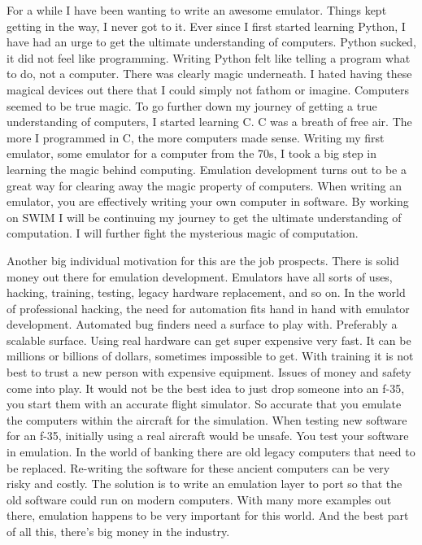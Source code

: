 \documentclass[
    parskip=half,
    fontsize=12pt,
    titlepage=firstiscover,
    toc=bibliography,
    numbers=endperiod
]{scrartcl}
\begin{document}
For a while I have been wanting to write an awesome emulator. Things kept getting in the way, I never got to it. Ever since I first started learning Python, I have had an urge to get the ultimate understanding of computers. Python sucked, it did not feel like programming. Writing Python felt like telling a program what to do, not a computer. There was clearly magic underneath. I hated having these magical devices out there that I could simply not fathom or imagine. Computers seemed to be true magic. To go further down my journey of getting a true understanding of computers, I started learning C. C was a breath of free air. The more I programmed in C, the more computers made sense. Writing my first emulator, some emulator for a computer from the 70s, I took a big step in learning the magic behind computing. Emulation development turns out to be a great way for clearing away the magic property of computers. When writing an emulator, you are effectively writing your own computer in software. By working on SWIM I will be continuing my journey to get the ultimate understanding of computation. I will further fight the mysterious magic of computation.

Another big individual motivation for this are the job prospects. There is solid money out there for emulation development. Emulators have all sorts of uses, hacking, training, testing, legacy hardware replacement, and so on. In the world of professional hacking, the need for automation fits hand in hand with emulator development. Automated bug finders need a surface to play with. Preferably a scalable surface. Using real hardware can get super expensive very fast. It can be millions or billions of dollars, sometimes impossible to get. With training it is not best to trust a new person with expensive equipment. Issues of money and safety come into play. It would not be the best idea to just drop someone into an f-35, you start them with an accurate flight simulator. So accurate that you emulate the computers within the aircraft for the simulation. When testing new software for an f-35, initially using a real aircraft would be unsafe. You test your software in emulation. In the world of banking there are old legacy computers that need to be replaced. Re-writing the software for these ancient computers can be very risky and costly. The solution is to write an emulation layer to port so that the old software could run on modern computers. With many more examples out there, emulation happens to be very important for this world. And the best part of all this, there's big money in the industry.
\end{document}
